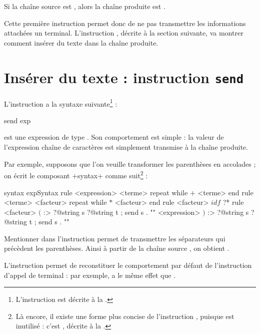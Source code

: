 Si la chaîne source est , alors la chaîne produite est .

Cette première instruction permet donc de ne pas transmettre les informations attachées un terminal. L'instruction , décrite à la section suivante, va montrer comment insérer du texte dans la chaîne produite.










\section{Insérer du texte : instruction \texttt{send}}

L'instruction  a la syntaxe suivante\footnote{L'instruction  est décrite à la .} :
\begin{galgascode}
send exp
\end{galgascode}

 est une expression de type . Son comportement est simple : la valeur de l'expression chaîne de caractères est simplement transmise à la chaîne produite.

Par exemple, supposons que l'on veuille transformer les parenthèses en accolades ; on écrit le composant \ggs+syntax+ comme suit\footnote{Là encore, il existe une forme plus concise de l'instruction , puisque  est inutilisé : c'est , décrite  à la .} :
\begin{galgascode}
syntax expSyntax {
  rule <expression> {
    <terme>
    repeat while $+$ <terme> end
  }
  rule <terme> {
    <facteur>
    repeat while $*$ <facteur> end
  }
  rule <facteur> {
    $idf$ ?*
  }
  rule <facteur> {
    $($ :> ?@string s ?@string t ; send s . "{"
    <expression>
    $)$ :> ?@string s ?@string t ; send s . "}"
  }
}
\end{galgascode}

Mentionner  dans l'instruction  permet de transmettre les séparateurs qui précèdent les parenthèses. Ainsi à partir de la chaîne source , on obtient .


L'instruction  permet de reconstituer le comportement par défaut de l'instruction d'appel de terminal : par exemple,  a le même effet que \galgas{$($ ;}.


